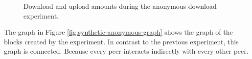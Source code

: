 \begin{figure}
\centering
{}
\caption{Download and upload amounts during the anonymous download experiment.}
\label{fig:synthetic-anonymous-amounts}
\end{figure}

The graph in Figure \ref{fig:synthetic-anonymous-graph} shows the graph of the blocks created by the experiment.
In contrast to the previous experiment, this graph is connected.
Because every peer interacts indirectly with every other peer.

